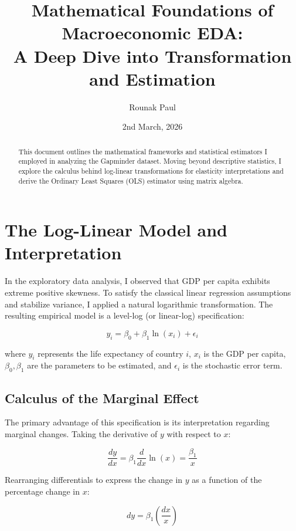 \documentclass[11pt, a4paper]{article}
\title{\textbf{Mathematical Foundations of Macroeconomic EDA:\\ A Deep Dive into Transformation and Estimation}}
\author{Rounak Paul}
\date{2nd March, 2026}
\begin{document}
\maketitle

\begin{abstract}
This document outlines the mathematical frameworks and statistical estimators I employed in analyzing the Gapminder dataset. Moving beyond descriptive statistics, I explore the calculus behind log-linear transformations for elasticity interpretations and derive the Ordinary Least Squares (OLS) estimator using matrix algebra.
\end{abstract}

\section{The Log-Linear Model and Interpretation}

In the exploratory data analysis, I observed that GDP per capita exhibits extreme positive skewness. To satisfy the classical linear regression assumptions and stabilize variance, I applied a natural logarithmic transformation. The resulting empirical model is a level-log (or linear-log) specification:

\begin{equation}
    y_i = \beta_0 + \beta_1 \ln(x_i) + \epsilon_i
    \end{equation}

    where $y_i$ represents the life expectancy of country $i$, $x_i$ is the GDP per capita, $\beta_0, \beta_1$ are the parameters to be estimated, and $\epsilon_i$ is the stochastic error term.

    \subsection{Calculus of the Marginal Effect}

    The primary advantage of this specification is its interpretation regarding marginal changes. Taking the derivative of $y$ with respect to $x$:

    \begin{equation}
        \frac{dy}{dx} = \beta_1 \frac{d}{dx} \ln(x) = \frac{\beta_1}{x}
        \end{equation}

        Rearranging differentials to express the change in $y$ as a function of the percentage change in $x$:

        \begin{equation}
            dy = \beta_1 \left( \frac{dx}{x} \right)
            \end{equation}
\end{document}
